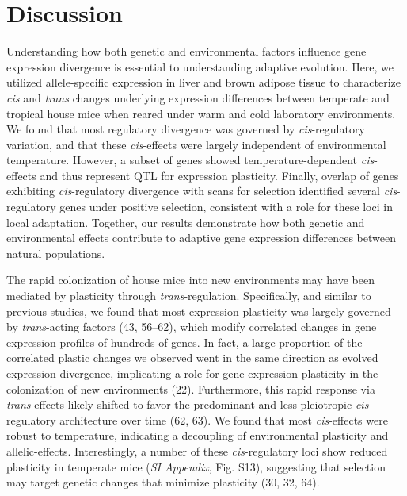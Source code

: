 \documentclass[9pt,twocolumn,twoside,lineno]{pnas-new}
\begin{document}
\hypertarget{discussion}{%
\section*{Discussion}\label{discussion}}

Understanding how both genetic and environmental factors influence gene
expression divergence is essential to understanding adaptive evolution.
Here, we utilized allele-specific expression in liver and brown adipose
tissue to characterize \emph{cis} and \emph{trans} changes underlying
expression differences between temperate and tropical house mice when
reared under warm and cold laboratory environments. We found that most
regulatory divergence was governed by \emph{cis}-regulatory variation,
and that these \emph{cis}-effects were largely independent of
environmental temperature. However, a subset of genes showed
temperature-dependent \emph{cis}-effects and thus represent QTL for
expression plasticity. Finally, overlap of genes exhibiting
\emph{cis}-regulatory divergence with scans for selection identified
several \emph{cis}-regulatory genes under positive selection, consistent
with a role for these loci in local adaptation. Together, our results
demonstrate how both genetic and environmental effects contribute to
adaptive gene expression differences between natural populations.

The rapid colonization of house mice into new environments may have been
mediated by plasticity through \emph{trans}-regulation. Specifically,
and similar to previous studies, we found that most expression
plasticity was largely governed by \emph{trans}-acting factors (43,
56--62), which modify correlated changes in gene expression profiles of
hundreds of genes. In fact, a large proportion of the correlated plastic
changes we observed went in the same direction as evolved expression
divergence, implicating a role for gene expression plasticity in the
colonization of new environments (22). Furthermore, this rapid response
via \emph{trans}-effects likely shifted to favor the predominant and
less pleiotropic \emph{cis}-regulatory architecture over time (62, 63).
We found that most \emph{cis}-effects were robust to temperature,
indicating a decoupling of environmental plasticity and allelic-effects.
Interestingly, a number of these \emph{cis}-regulatory loci show reduced
plasticity in temperate mice (\emph{SI Appendix}, Fig. S13), suggesting
that selection may target genetic changes that minimize plasticity (30,
32, 64).
\end{document}
